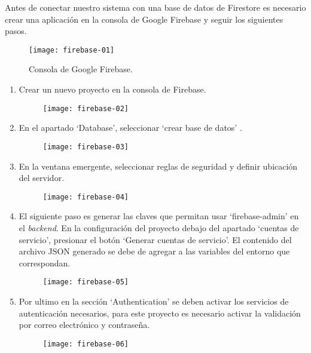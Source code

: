 Antes de conectar nuestro sistema con una base de datos de Firestore es necesario crear una aplicación en la consola de Google Firebase y seguir los siguientes pasos.
\vspace{0.8cm}

\begin{figure}[H]
  \centering
  \texttt{[image: firebase-01]}
  \caption{Consola de Google Firebase.}
\end{figure}

\begin{enumerate}
  \item Crear un nuevo proyecto en la consola de Firebase.

  \begin{figure}[H]
    \centering
    \texttt{[image: firebase-02]}
  \end{figure}

  \item En el apartado `Database', seleccionar `crear base de datos' .

  \begin{figure}[H]
    \centering
    \texttt{[image: firebase-03]}
  \end{figure}

  \item En la ventana emergente, seleccionar reglas de seguridad y definir ubicación del servidor.

  \begin{figure}[H]
    \centering
    \texttt{[image: firebase-04]}
  \end{figure}

  \item El siguiente paso es generar las claves que permitan usar `firebase-admin' en el \textit{backend}. En la configuración del proyecto debajo del apartado `cuentas de servicio', presionar el botón `Generar cuentas de servicio'. El contenido del archivo JSON generado se debe de agregar a las variables del entorno que correspondan.

  \begin{figure}[H]
    \centering
    \texttt{[image: firebase-05]}
  \end{figure}

  \item Por ultimo en la sección `Authentication' se deben activar los servicios de autenticación necesarios, para este proyecto es necesario activar la validación por correo electrónico y contraseña.

  \begin{figure}[H]
    \centering
    \texttt{[image: firebase-06]}
  \end{figure}
\end{enumerate}


